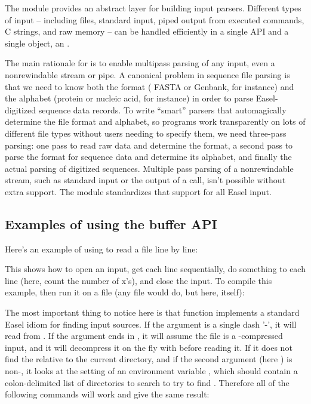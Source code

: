The  module provides an abstract layer for building
input parsers. Different types of input -- including files, standard
input, piped output from executed commands, C strings, and raw memory
-- can be handled efficiently in a single API and a single object, an
. 

The main rationale for  is to enable multipass parsing
of any input, even a nonrewindable stream or pipe. A canonical problem
in sequence file parsing is that we need to know both the format (
FASTA or Genbank, for instance) and the alphabet (protein or nucleic
acid, for instance) in order to parse Easel-digitized sequence data
records. To write ``smart'' parsers that automagically determine the
file format and alphabet, so programs work transparently on lots of
different file types without users needing to specify them, we need
three-pass parsing: one pass to read raw data and determine the
format, a second pass to parse the format for sequence data and
determine its alphabet, and finally the actual parsing of digitized
sequences. Multiple pass parsing of a nonrewindable stream, such as
standard input or the output of a  call, isn't possible
without extra support. The  module standardizes that
support for all Easel input.

\subsection{Examples of using the buffer API}

Here's an example of using  to read a file line by
line:



This shows how to open an input, get each line sequentially, do
something to each line (here, count the number of x's), and close the
input.  To compile this example, then run it on a file (any file would
do, but here,  itself):


The most important thing to notice here is that
 function implements a standard Easel idiom
for finding input sources. If the  argument is a
single dash '-', it will read from . If the
 argument ends in , it will assume the file
is a -compressed input, and it will decompress it on the
fly with  before reading it. If it does not find the
 relative to the current directory, and if the second
argument (here ) is non-, it looks at the
setting of an environment variable , which should
contain a colon-delimited list of directories to search to try to find
. Therefore all of the following commands will work
and give the same result:

